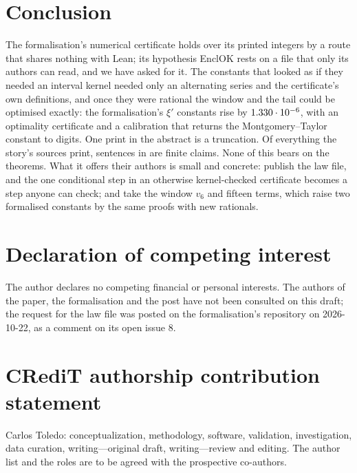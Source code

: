 \documentclass[preprint,11pt,authoryear,a4paper]{elsarticle}
\begin{document}
\section{Conclusion}\label{sec:conclusions}

The formalisation's numerical certificate holds over its printed integers by a route that shares nothing with Lean; its hypothesis EnclOK rests on a file that only its authors can read, and we have asked for it. The constants that looked as if they needed an interval kernel needed only an alternating series and the certificate's own definitions, and once they were rational the window and the tail could be optimised exactly: the formalisation's $\xi'$ constants rise by $1.330\cdot10^{-6}$, with an optimality certificate and a calibration that returns the Montgomery--Taylor constant to \RfMtAgreeDigits{} digits. One print in the abstract is a truncation. Of everything the story's sources print, \RfShaped{} sentences in \RfSentences{} are finite claims. None of this bears on the theorems. What it offers their authors is small and concrete: publish the law file, and the one conditional step in an otherwise kernel-checked certificate becomes a step anyone can check; and take the window $v_6$ and fifteen terms, which raise two formalised constants by the same proofs with new rationals.

\section*{Declaration of competing interest}
The author declares no competing financial or personal interests. The authors of the paper, the formalisation and the post have not been consulted on this draft; the request for the law file was posted on the formalisation's repository on 2026-10-22, as a comment on its open issue 8.

\section*{CRediT authorship contribution statement}
Carlos Toledo: conceptualization, methodology, software, validation, investigation, data curation, writing---original draft, writing---review and editing. The author list and the roles are to be agreed with the prospective co-authors.
\end{document}
